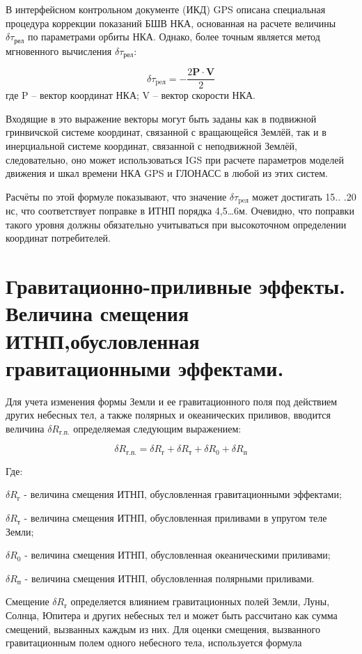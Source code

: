 \documentclass[14pt,a4paper,oneside]{extarticle}
\begin{document}
В интерфейсном контрольном документе (ИКД) GPS описана специальная процедура коррекции показаний БШВ НКА, основанная на расчете величины $\delta \tau_\text{рел}$ по параметрами орбиты НКА. Однако, более точным является метод мгновенного вычисления $\delta \tau_\text{рел}$:

\[\delta\tau_{\text{pe}\text{л}} = - \frac { 2 \boldsymbol{P}\cdot\boldsymbol{V}}{2}\] где P – вектор координат НКА; V – вектор скорости НКА.

Входящие в это выражение векторы могут быть заданы как в подвижной гринвичской системе координат, связанной с вращающейся Землёй, так и в инерциальной системе координат, связанной с неподвижной Землёй, следовательно, оно может использоваться IGS при расчете параметров моделей движения и шкал времени НКА GPS и ГЛОНАСС в любой из этих систем.

Расчёты по этой формуле показывают, что значение $\delta\tau_{\text{pe}\text{л}}$ может достигать 15.. .20 нс, что соответствует поправке в ИТНП порядка 4,5…6м. Очевидно, что поправки такого уровня должны обязательно учитываться при высокоточном определении координат потребителей.

\section{Гравитационно-приливные эффекты. Величина смещения ИТНП,обусловленная гравитационными эффектами.}

Для учета изменения формы Земли и ее гравитационного поля под действием других небесных тел, а также полярных и океанических приливов, вводится величина $\delta R_\text{г.п.}$ определяемая следующим выражением:

\[\delta R_\text{г.п.}=\delta R_\text{г}+\delta R_\text{т}+\delta R_\text{0}+\delta R_\text{п}\]

Где:

$\delta R_\text{г}$ - величина смещения ИТНП, обусловленная гравитационными эффектами;

$\delta R_\text{т}$ - величина смещения ИТНП, обусловленная приливами в упругом теле Земли;

$\delta R_\text{0}$ - величина смещения ИТНП, обусловленная океаническими приливами;

$\delta R_\text{п}$ - величина смещения ИТНП, обусловленная полярными приливами.

Смещение $\delta R_\text{г}$ определяется влиянием гравитационных полей Земли, Луны, Солнца, Юпитера и других небесных тел и может быть рассчитано как сумма смещений, вызванных каждым из них. Для оценки смещения, вызванного гравитационным полем одного небесного тела, используется формула
\end{document}

